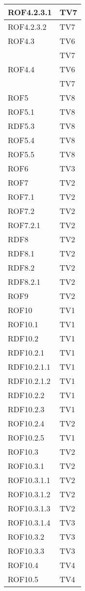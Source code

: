 \begin{center}
\begin{longtable}{|p{7cm}|p{7cm}|}
ROF4.2.3.1 & TV7\\
\midrule
ROF4.2.3.2 & TV7\\
\midrule
ROF4.3 & TV6\\ & TV7\\
\midrule
ROF4.4 & TV6\\ & TV7\\
\midrule
ROF5 & TV8\\
\midrule
ROF5.1 & TV8\\
\midrule
RDF5.3 & TV8\\
\midrule
ROF5.4 & TV8\\
\midrule
ROF5.5 & TV8\\
\midrule
ROF6 & TV3\\
\midrule
ROF7 & TV2\\
\midrule
ROF7.1 & TV2\\
\midrule
ROF7.2 & TV2\\
\midrule
ROF7.2.1 & TV2\\
\midrule
RDF8 & TV2\\
\midrule
RDF8.1 & TV2\\
\midrule
RDF8.2 & TV2\\
\midrule
RDF8.2.1 & TV2\\
\midrule
ROF9 & TV2\\
\midrule
ROF10 & TV1\\
\midrule
ROF10.1 & TV1\\
\midrule
RDF10.2 & TV1\\
\midrule
RDF10.2.1 & TV1\\
\midrule
RDF10.2.1.1 & TV1\\
\midrule
RDF10.2.1.2 & TV1\\
\midrule
RDF10.2.2 & TV1\\
\midrule
RDF10.2.3 & TV1\\
\midrule
ROF10.2.4 & TV2\\
\midrule
ROF10.2.5 & TV1\\
\midrule
ROF10.3 & TV2\\
\midrule
ROF10.3.1 & TV2\\
\midrule
ROF10.3.1.1 & TV2\\
\midrule
ROF10.3.1.2 & TV2\\
\midrule
ROF10.3.1.3 & TV2\\
\midrule
ROF10.3.1.4 & TV3\\
\midrule
ROF10.3.2 & TV3\\
\midrule
ROF10.3.3 & TV3\\
\midrule
ROF10.4 & TV4\\
\midrule
ROF10.5 & TV4\\

\end{longtable}
\end{center}
